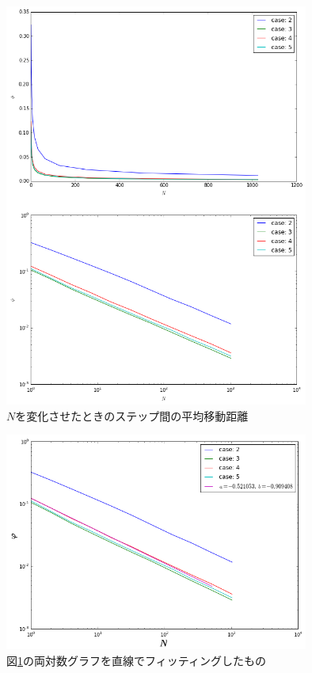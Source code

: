 \begin{figure}[H]
    \begin{center}
        \includegraphics[width=10cm]{../img/simple3_N_2.png}
        \caption{$N$を変化させたときのステップ間の平均移動距離}
        \label{fig:f13}
    \end{center}
\end{figure}
\begin{figure}[H]
    \begin{center}
        \includegraphics[width=10cm]{../img/simple3_N_2_fit.png}
        \caption{図\ref{fig:f13}の両対数グラフを直線でフィッティングしたもの}
        \label{fig:f14}
    \end{center}
\end{figure}


